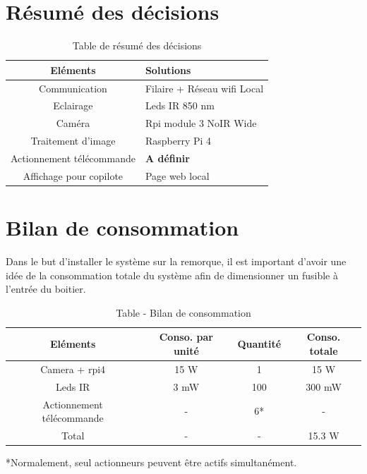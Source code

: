 \section{Résumé des décisions}
\begin{table}[H]
    \begin{center}
        \caption{Table de résumé des décisions}
        \begin{tabular}{|c|l|}
            Eléments                  & Solutions                         \\ \hline
            Communication             & Filaire + Réseau \Gls{wifi} Local \\
            Eclairage                 & Leds IR 850 \si{\nano\metre}      \\
            Caméra                    & Rpi module 3 NoIR Wide            \\
            Traitement d'image        & Raspberry Pi 4                    \\
            Actionnement télécommande & \textbf{A définir}                \\
            Affichage pour copilote   & Page web local                    \\
        \end{tabular}
    \end{center}
\end{table}
\newpage
\section{Bilan de consommation}
Dans le but d'installer le système sur la remorque, il est important d'avoir une idée de la consommation totale du système afin de dimensionner
un fusible à l'entrée du boitier.

\begin{table}[H]
    \begin{center}
        \caption{Table - Bilan de consommation}
        \begin{tabular}{|c|c|c|c|}
            Eléments                  & Conso. par unité   & Quantité & Conso. totale        \\ \hline
            Camera + \Gls{rpi4}       & 15 \si{\watt}      & 1        & 15    \si{\watt}     \\
            Leds IR                   & 3 \si{\milli\watt} & 100      & 300 \si{\milli\watt} \\
            Actionnement télécommande & -                  & 6*       & -                    \\
            Total                     & -                  & -        & 15.3 \si{\watt}      \\
        \end{tabular}
    \end{center}

    *Normalement, seul actionneurs peuvent être actifs simultanément.
\end{table}

